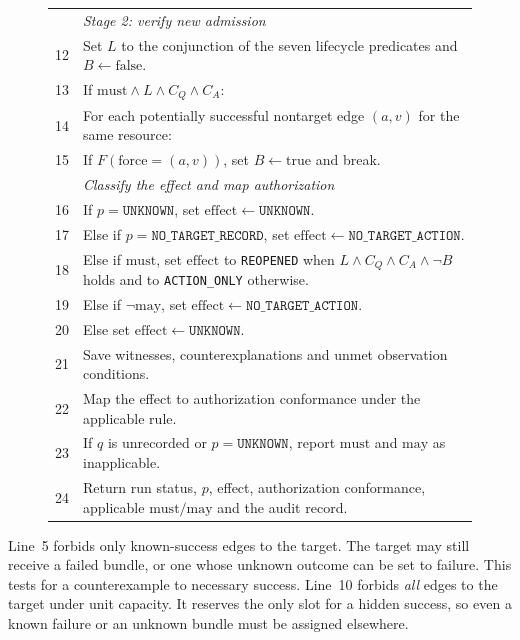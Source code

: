 \begin{figure}[t]
\begin{minipage}{\textwidth}
\begin{tabularx}{\linewidth}{@{}r@{\quad}X@{}}
& \textit{Stage 2: verify new admission}\\
12 & Set $L$ to the conjunction of the seven lifecycle predicates and $B\gets\mathrm{false}$.\\
13 & If $\mathrm{must}\land L\land C_Q\land C_A$:\\
14 & \hspace*{1em}For each potentially successful nontarget edge $(a,v)$ for the same resource:\\
15 & \hspace*{2em}If $F(\mathrm{force}=(a,v))$, set $B\gets\mathrm{true}$ and break.\\
& \textit{Classify the effect and map authorization}\\
16 & If $p=\texttt{UNKNOWN}$, set $\mathrm{effect}\gets\texttt{UNKNOWN}$.\\
17 & Else if $p=\texttt{NO\_TARGET\_RECORD}$, set $\mathrm{effect}\gets\texttt{NO\_TARGET\_ACTION}$.\\
18 & Else if $\mathrm{must}$, set $\mathrm{effect}$ to \texttt{REOPENED} when $L\land C_Q\land C_A\land\neg B$ holds and to \texttt{ACTION\_ONLY} otherwise.\\
19 & Else if $\neg\mathrm{may}$, set $\mathrm{effect}\gets\texttt{NO\_TARGET\_ACTION}$.\\
20 & Else set $\mathrm{effect}\gets\texttt{UNKNOWN}$.\\
21 & Save witnesses, counterexplanations and unmet observation conditions.\\
22 & Map the effect to authorization conformance under the applicable rule.\\
23 & If $q$ is unrecorded or $p=\texttt{UNKNOWN}$, report $\mathrm{must}$ and $\mathrm{may}$ as inapplicable.\\
24 & Return run status, $p$, effect, authorization conformance, applicable $\mathrm{must}/\mathrm{may}$ and the audit record.\\
\bottomrule
\end{tabularx}
\end{minipage}
\end{figure}

Line~5 forbids only known-success edges to the target. The target may still receive a failed bundle, or one whose unknown outcome can be set to failure. This tests for a counterexample to necessary success. Line~10 forbids \emph{all} edges to the target under unit capacity. It reserves the only slot for a hidden success, so even a known failure or an unknown bundle must be assigned elsewhere.

